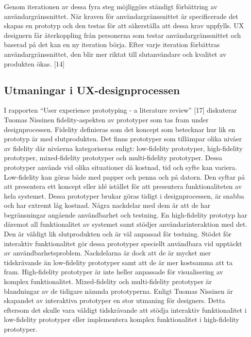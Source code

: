 \documentclass{kththesis}
\begin{document}
Genom iterationen av dessa fyra steg möjliggörs ständigt förbättring av användargränssnittet. När kraven för användargränssnittet är specificerade det skapas en prototyp och den testas för att säkerställa att dessa krav uppfylls. UX designern får återkoppling från personerna som testar användargränssnittet och baserad på det kan en ny iteration börja. Efter varje iteration förbättras användargränssnittet, den blir mer riktat till slutanvändare och kvalitet av produkten ökas. [14]

\subsection{Utmaningar i UX-designprocessen}

I rapporten “User experience prototyping - a literature review” [17] diskuterar Tuomas Nissinen fidelity-aspekten av prototyper som tas fram under designprocessen. Fidelity definieras som det koncept som betecknar hur lik en prototyp är med slutprodukten. Det finns prototyper som tillämpar olika nivåer av fidelity där nivåerna kategoriseras enligt: low-fidelity prototyper, high-fidelity prototyper, mixed-fidelity prototyper och multi-fidelity prototyper. Dessa prototyper används vid olika situationer då kostnad, tid och syfte kan variera. Low-fidelity kan göras både med papper och penna och på datorn. Den syftar på att presentera ett koncept eller idé istället för att presentera funktionaliteten av hela systemet. Dessa prototyper brukar göras tidigt i designprocessen, är snabba och har extremt låg kostnad. Några nackdelar med dem är att de har begränsningar angående användbarhet och testning. En high-fidelity prototyp har däremot all funktionalitet av systemet samt stödjer användarinteraktion med det. Den är väldigt lik slutprodukten och är väl anpassad för testning. Stödet för interaktiv funktionalitet gör dessa prototyper speciellt användbara vid upptäckt av användbarhetsproblem. Nackdelarna är dock att de är mycket mer tidskrävande än low-fidelity prototyper samt att de är mer kostsamma att ta fram. High-fidelity prototyper är inte heller anpassade för visualisering av komplex funktionalitet. Mixed-fidelity och multi-fidelity prototyper är blandningar av de tidigare nämnda prototyperna. Enligt Tuomas Nissinen är skapandet av interaktiva prototyper en stor utmaning för designers. Detta eftersom det skulle vara väldigt tidskrävande att stödja interaktiv funktionalitet i low-fidelity prototyper eller implementera komplex funktionalitet i high-fidelity prototyper.
\end{document}
